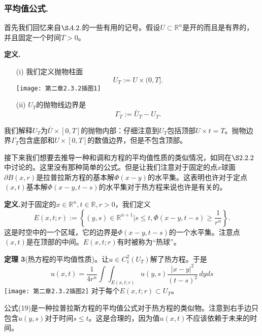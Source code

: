 \documentclass[leqno]{article}
\numberwithin{equation}{subsection}%
\begin{document}
\subsubsection{平均值公式.}
首先我们回忆来自$\S A.2.$的一些有用的记号。假设$U\subset\mathbb{R}^{n}$是开的而且是有界的，并且固定一个时间$T>0$。
\par
\noindent\textbf{定义.}
\begin{enumerate}[fullwidth,itemindent=2em]
	\item[(i)]我们定义抛物柱面
	\begin{equation*}
	U_{T}:=U\times(0,T].
	\end{equation*}
	\texttt{[image: 第二章2.3.2插图1]}
	\item[(ii)]$U_{T}$的抛物线边界是
	\begin{equation*}
	\Gamma_{T}:=\bar{U}_{T}-U_{T}.
	\end{equation*} 
\end{enumerate}
\par
我们解释$U_{T}$为$\bar{U}\times [0,T]$的抛物内部：仔细注意到$U_{T}$包括顶部$U\times {t=T}$。抛物边界$\Gamma_{T}$包含底部和$U\times [0,T]$的数值边界，但是不包含顶部。
\par
接下来我们想要去推导一种和调和方程的平均值性质的类似情况，如同在$\S 2.2.2$中讨论的。这里没有那种简单的公式。但是让我们注意对于固定的点$x$球面$\partial B(x,r)$是拉普拉斯方程的基本解$\Phi(x-y)$的水平集。这表明也许对于定点$(x,t)$基本解$\Phi(x-y,t-s)$的水平集对于热方程来说也许是有关的。
\par
\noindent\textbf{定义.}对于固定的$x\in\mathbb{R}^{n},t\in\mathbb{R},r>0$，我们定义
\begin{equation*}
E(x,t;r):=\left\{(y,s)\in\mathbb{R}^{n+1}|s\leq t,\Phi(x-y,t-s)\geq\frac{1}{r^{n}}\right\}.
\end{equation*}
这是时空中的一个区域，它的边界是$\Phi(x-y,t-s)$的一个水平集。注意点$(x,t)$是在顶部的中间。$E(x,t;r)$有时被称为“热球”。
\par
\noindent\textbf{定理 3}(热方程的平均值性质)。让$u\in C_{1}^{2}(U_{T})$解了热方程。于是
\begin{equation}
u(x,t)=\frac{1}{4r^{n}}\int\!\int_{E(x,t;r)}u(y,s)\frac{|x-y|^{2}}{(t-s)^{2}}\,dyds
\end{equation}
\texttt{[image: 第二章2.3.2插图2]}
对于每个$E(x,t;r)\subset U_{T}$。
\par
公式(19)是一种拉普拉斯方程的平均值公式对于热方程的类似物。注意到右手边只包含$u(y,s)$对于时间$s\leq t$。这是合理的，因为值$u(x,t)$不应该依赖于未来的时间。
\par
\end{document}
